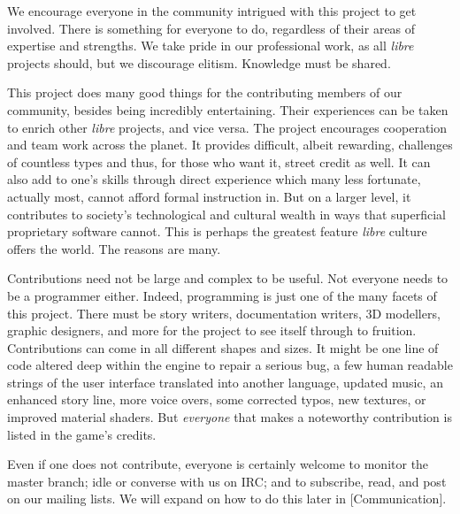 
We encourage everyone in the community intrigued with this project to get involved. There is something for everyone to do, regardless of their areas of expertise and strengths. We take pride in our professional work, as all {\it libre} projects should, but we discourage elitism. Knowledge must be shared.

This project does many good things for the contributing members of our community, besides being incredibly entertaining. Their experiences can be taken to enrich other {\it libre} projects, and vice versa. The project encourages cooperation and team work across the planet. It provides difficult, albeit rewarding, challenges of countless types and thus, for those who want it, street credit as well. It can also add to one's skills through direct experience which many less fortunate, actually most, cannot afford formal instruction in. But on a larger level, it contributes to society's technological and cultural wealth in ways that superficial proprietary software cannot. This is perhaps the greatest feature {\it libre} culture offers the world. The reasons are many.

Contributions need not be large and complex to be useful. Not everyone needs to be a programmer either. Indeed, programming is just one of the many facets of this project. There must be story writers, documentation writers, 3D modellers, graphic designers, and more for the project to see itself through to fruition. Contributions can come in all different shapes and sizes. It might be one line of code altered deep within the engine to repair a serious bug, a few human readable strings of the user interface translated into another language, updated music, an enhanced story line, more voice overs, some corrected typos, new textures, or improved material shaders. But {\it everyone} that makes a noteworthy contribution is listed in the game's credits.

Even if one does not contribute, everyone is certainly welcome to monitor the master branch; idle or converse with us on IRC; and to subscribe, read, and post on our mailing lists. We will expand on how to do this later in [Communication].

